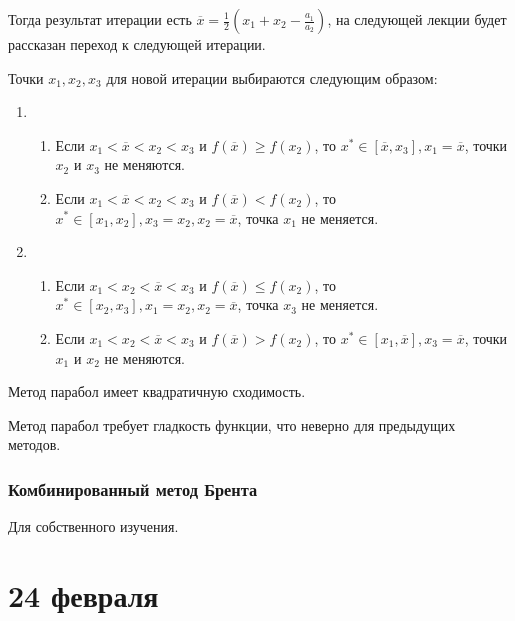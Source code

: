 \documentclass[12pt, a4paper, oneside]{book}
\begin{document}
Тогда результат итерации есть \(\overline x = \frac{1}{2} \left( x_1 + x_2 - \frac{a_1}{a_2} \right)\), на следующей лекции будет рассказан переход к следующей итерации.

Точки \(x_1, x_2, x_3\) для новой итерации выбираются следующим образом:
\begin{enumerate}
    \item \begin{enumerate}
              \item Если \(x_1 < \overline x < x_2 < x_3\) и \(f(\overline x) \geq f(x_2)\), то \(x^* \in [\overline x, x_3], x_1 = \overline x\), точки \(x_2\) и \(x_3\) не меняются.
              \item Если \(x_1 < \overline x < x_2 < x_3\) и \(f(\overline x) < f(x_2)\), то \(x^* \in [x_1, x_2], x_3 = x_2, x_2 = \overline x\), точка \(x_1\) не меняется.
          \end{enumerate}
    \item \begin{enumerate}
              \item Если \(x_1 < x_2 < \overline x < x_3\) и \(f(\overline x) \leq f(x_2)\), то \(x^* \in [x_2, x_3], x_1 = x_2, x_2 = \overline x\), точка \(x_3\) не меняется.
              \item Если \(x_1 < x_2 < \overline x < x_3\) и \(f(\overline x) > f(x_2)\), то \(x^* \in [x_1, \overline x], x_3 = \overline x\), точки \(x_1\) и \(x_2\) не меняются.
          \end{enumerate}
\end{enumerate}

\begin{remark}
    Метод парабол имеет квадратичную сходимость.
\end{remark}

\begin{remark}
    Метод парабол требует гладкость функции, что неверно для предыдущих методов.
\end{remark}

\subsection{Комбинированный метод Брента}

Для собственного изучения.

\chapter{24 февраля}
\end{document}
